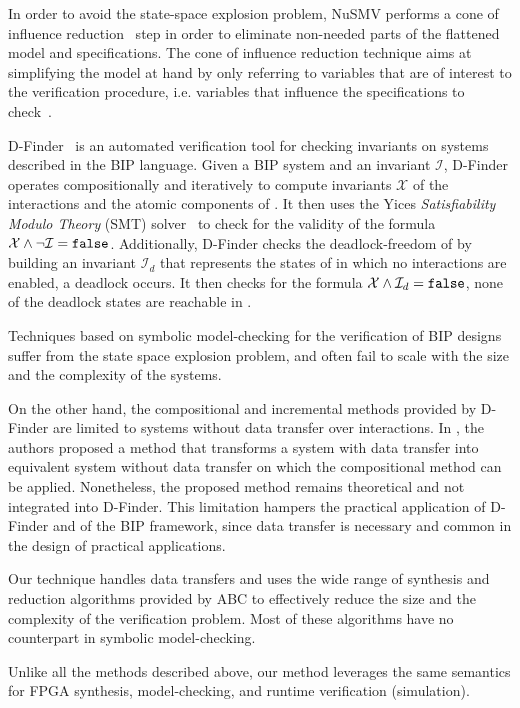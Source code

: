 In order to avoid the state-space explosion problem, NuSMV performs a cone of 
influence reduction~\cite{berezin1998compositional} step in order to eliminate
non-needed parts of the flattened model and specifications. The cone of influence
reduction technique aims at simplifying the model at hand by only 
referring to variables that are of interest to the verification procedure, i.e. variables
that influence the specifications to check~\cite{clarke1999model}.

D-Finder~\cite{dfinder} is an automated verification tool for checking invariants
on systems described in the BIP language. Given a BIP system \Pm and 
an invariant $\mathcal{I}$, D-Finder operates  compositionally and iteratively
to compute invariants $\mathcal{X}$ of the interactions and the atomic 
components of \Pm. It then uses the Yices {\em Satisfiability Modulo
Theory} (SMT) solver~\cite{dutertre2006fast} to check for the validity 
of the formula $\mathcal{X} \land \lnot \mathcal{I} = \mathtt{false}$. 
Additionally, D-Finder checks the deadlock-freedom of  \Pm by building an invariant 
$\mathcal{I}_d$ that represents the states of \Pm in which no interactions 
are enabled, \ie{} a deadlock occurs. It then checks for the formula
$\mathcal{X} \land \mathcal{I}_d = \mathtt{false}$, \ie{} none of the deadlock states
are reachable in \Pm.   

Techniques based on symbolic model-checking for the verification of 
BIP designs suffer from the state space explosion problem, and often 
fail to scale with the size and the complexity of the systems. 



On the other hand, the compositional and incremental methods provided by D-Finder are limited to systems without data
transfer over interactions. In \cite{hungthesis10}, the authors proposed a method that transforms a system with data transfer into equivalent system without data transfer on which the compositional method can be applied. Nonetheless, the proposed method remains theoretical and not integrated into D-Finder. This limitation hampers the practical application of D-Finder and of the BIP framework, since data transfer is necessary and common in the design of practical applications.


Our technique handles data transfers and uses the wide range of synthesis 
and reduction algorithms provided by ABC to effectively reduce the size and 
the complexity of the verification problem. Most of these algorithms have no counterpart
in symbolic model-checking.  

Unlike all the methods described above, our method leverages
the same semantics for FPGA synthesis, model-checking, 
and runtime verification (simulation). 
